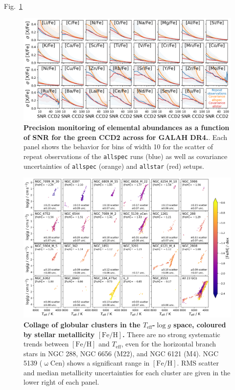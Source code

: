 \documentclass[
  journal=pasa,
  manuscript=research-paper, %
  year=2024,
  volume=37
]{cup-journal}
\newcommand{\Teff}{$T_\mathrm{eff}$\xspace}
\newcommand{\logg}{$\log g$\xspace}
\newcommand{\feh}{$\mathrm{[Fe/H]}$\xspace}
\begin{document}
Fig.~\ref{fig:galah_dr4_precision_abundances}

\begin{figure}[ht]
 \centering
 \includegraphics[width=\textwidth]{figures/galah_dr4_precision_abundances.png}
 \caption{\textbf{Precision monitoring of elemental abundances as a function of SNR for the green CCD2 across for GALAH DR4.}. Each panel shows the behavior for bins of width 10 for the scatter of repeat observations of the \texttt{allspec} runs (blue) as well as covariance uncertainties of \texttt{allspec} (orange) and \texttt{allstar} (red) setups.}
 \label{fig:galah_dr4_precision_abundances}
\end{figure}

\begin{figure}
\includegraphics[width=\textwidth]{figures/galah_dr4_gcs_teff_logg.png}
\caption{
\textbf{Collage of globular clusters in the \Teff-\logg space, coloured by stellar metallicity \feh.} There are no strong systematic trends between \feh and \Teff, even for the horizontal branch stars in NGC 288, NGC 6656 (M22), and NGC 6121 (M4). NGC 5139 ($\upomega$Cen) shows a significant range in \feh. RMS scatter and median metallicity uncertainties for each cluster are given in the lower right of each panel.}
\label{fig:galah_dr4_gcs_teff_logg}
\end{figure}
\end{document}
